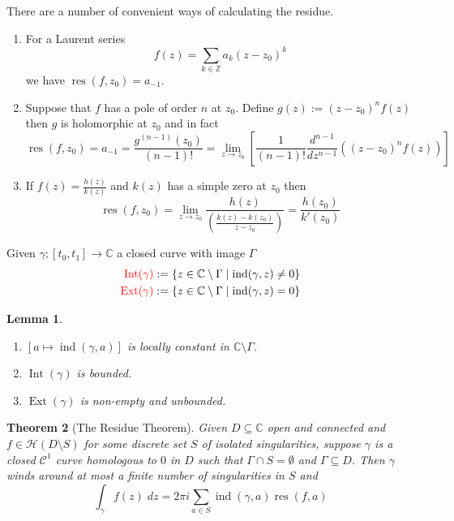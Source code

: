 \documentclass[11pt]{article}
\newcommand{\defeq}{:=}
\DeclareMathOperator{\ind}{\text{ind}}
\DeclareMathOperator{\res}{\text{res}}
\DeclareMathOperator{\Int}{\text{Int}}
\DeclareMathOperator{\Ext}{\text{Ext}}
\newcommand{\relmiddle}[1]{\mathrel{}\middle#1\mathrel{}}
\newcommand{\rmv}{\relmiddle|}
\newcommand{\C}{\mathbb{C}}
\newcommand{\Z}{\mathbb{Z}}
\newenvironment{defin}
	{\begin{mdframed}[backgroundcolor=white, roundcorner=5pt, linewidth=1pt]}
	{\end{mdframed}}
\newcommand{\mdf}[1]{{\color{red} #1}}
\newtheorem{theorem}{Theorem}[section]
\newtheorem{lemma}[theorem]{Lemma}
\begin{document}
There are a number of convenient ways of calculating the residue.
\begin{enumerate}
	\item For a Laurent series
	\[
		f(z)=\sum_{k\in\Z}a_k(z-z_0)^k
	\]
	we have $\res(f, z_0)=a_{-1}$.
\item Suppose that $f$ has a pole of order $n$ at $z_0$.
	Define $g(z)\defeq(z-z_0)^nf(z)$ then $g$ is holomorphic at $z_0$ and in fact
	\[
		\res(f,z_0)=a_{-1}=\frac{g^{(n-1)}(z_0)}{(n-1)!}=\lim_{z\to z_0}\left[\frac{1}{(n-1)!}\frac{d^{n-1}}{dz^{n-1}}\left((z-z_0)^nf(z)\right)\right]
	\]
\item If $f(z)=\frac{h(z)}{k(z)}$ and $k(z)$ has a simple zero at $z_0$ then
	\[
		\res(f,z_0)=\lim_{z\to z_0} \frac{h(z)}{\left(\frac{k(z)-k(z_0)}{z-z_0}\right)}=\frac{h(z_0)}{k'(z_0)}
	\]
\end{enumerate}

\begin{defin}
	Given $\gamma;[t_0, t_1]\to\C$ a closed curve with image $\Gamma$
	\begin{align*}
		\mdf{\Int(\gamma)}&\defeq\left\{z\in\C\setminus\Gamma \rmv \ind(\gamma, z)\neq 0\right\} \\
		\mdf{\Ext(\gamma)}&\defeq\left\{z\in\C\setminus\Gamma \rmv \ind(\gamma, z) = 0\right\}
	\end{align*}
\end{defin}

\begin{lemma}
\begin{enumerate}[label=(\alph*)]
	\item $\left[a\mapsto\ind(\gamma, a)\right]$ is locally constant in $\C\setminus\Gamma$.
	\item $\Int(\gamma)$ is bounded.
	\item $\Ext(\gamma)$ is non-empty and unbounded.
\end{enumerate}
\end{lemma}

\begin{theorem}[The Residue Theorem]
Given $D\subseteq\C$ open and connected and $f\in\mathcal{H}(D\setminus S)$ for some discrete set $S$ of isolated singularities, suppose $\gamma$ is a closed $\mathcal{C}^1$ curve homologous to $0$ in $D$ such that $\Gamma\cap S = \emptyset$ and $\Gamma\subseteq D$.
Then $\gamma$ winds around at most a finite number of singularities in $S$ and
\[
	\int_\gamma f(z)\;dz = 2\pi i \sum_{a\in S}\ind(\gamma, a)\res(f, a)
\]
\end{theorem}
\end{document}
